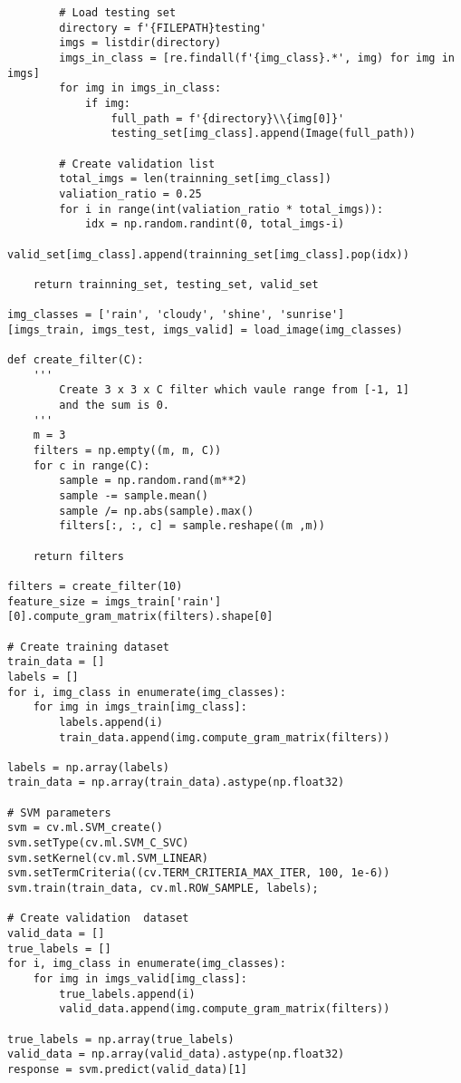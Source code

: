 \documentclass[11pt]{article}
\begin{document}
\begin{lstlisting}
        # Load testing set
        directory = f'{FILEPATH}testing'
        imgs = listdir(directory)
        imgs_in_class = [re.findall(f'{img_class}.*', img) for img in imgs]
        for img in imgs_in_class:
            if img:
                full_path = f'{directory}\\{img[0]}'
                testing_set[img_class].append(Image(full_path))

        # Create validation list
        total_imgs = len(trainning_set[img_class])
        valiation_ratio = 0.25
        for i in range(int(valiation_ratio * total_imgs)):
            idx = np.random.randint(0, total_imgs-i)
            valid_set[img_class].append(trainning_set[img_class].pop(idx))

    return trainning_set, testing_set, valid_set

img_classes = ['rain', 'cloudy', 'shine', 'sunrise']
[imgs_train, imgs_test, imgs_valid] = load_image(img_classes)

def create_filter(C):
    '''
        Create 3 x 3 x C filter which vaule range from [-1, 1]
        and the sum is 0.
    '''
    m = 3
    filters = np.empty((m, m, C))
    for c in range(C):
        sample = np.random.rand(m**2)
        sample -= sample.mean()
        sample /= np.abs(sample).max()
        filters[:, :, c] = sample.reshape((m ,m))

    return filters

filters = create_filter(10)
feature_size = imgs_train['rain'][0].compute_gram_matrix(filters).shape[0]

# Create training dataset
train_data = []
labels = []
for i, img_class in enumerate(img_classes):
    for img in imgs_train[img_class]:
        labels.append(i)
        train_data.append(img.compute_gram_matrix(filters))

labels = np.array(labels)
train_data = np.array(train_data).astype(np.float32)

# SVM parameters
svm = cv.ml.SVM_create()
svm.setType(cv.ml.SVM_C_SVC)
svm.setKernel(cv.ml.SVM_LINEAR)
svm.setTermCriteria((cv.TERM_CRITERIA_MAX_ITER, 100, 1e-6))
svm.train(train_data, cv.ml.ROW_SAMPLE, labels);

# Create validation  dataset
valid_data = []
true_labels = []
for i, img_class in enumerate(img_classes):
    for img in imgs_valid[img_class]:
        true_labels.append(i)
        valid_data.append(img.compute_gram_matrix(filters))

true_labels = np.array(true_labels)
valid_data = np.array(valid_data).astype(np.float32)
response = svm.predict(valid_data)[1]


\end{lstlisting}
\end{document}

